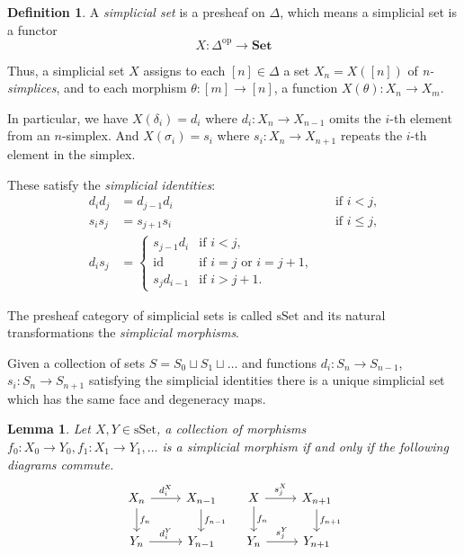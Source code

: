 \documentclass[12pt]{article}
\newtheorem{lemma}{Lemma}[section]
\theoremstyle{definition}
\newtheorem{definition}{Definition}[section]
\newcommand{\1}{\mathbbm{1}}
\newcommand{\Set}{\mathbf{Set}}
\begin{document}
\begin{definition}
    A \emph{simplicial set} is a presheaf on \( \Delta \), which means a simplicial set is a functor
    \[
    X \colon \Delta^{\mathrm{op}} \to \Set
    \]
    
    Thus, a simplicial set \( X \) assigns to each \( [n] \in \Delta \) a set \( X_n = X([n]) \) of \emph{n-simplices}, and to each morphism \( \theta \colon [m] \to [n] \), a function \( X(\theta) \colon X_n \to X_m \).
    
    In particular, we have $X(\delta_i) = d_i$ where $d_i: X_n\to X_{n-1}$ omits the $i$-th element from an $n$-simplex. And $X(\sigma_i) = s_i$ where $s_i: X_n \to X_{n+1}$ repeats the $i$-th element in the simplex.
    
    These satisfy the \emph{simplicial identities}:
    \[
    \begin{aligned}
    d_i d_j &= d_{j-1} d_i && \text{if } i < j, \\
    s_i s_j &= s_{j+1} s_i && \text{if } i \leq j, \\
    d_i s_j &=
    \begin{cases}
    s_{j-1} d_i & \text{if } i < j, \\
    \mathrm{id} & \text{if } i = j \text{ or } i = j+1, \\
    s_j d_{i-1} & \text{if } i > j+1.
    \end{cases}
    \end{aligned}
    \]

    The presheaf category of simplicial sets is called $\mathrm{sSet}$ and its natural transformations the \emph{simplicial morphisms}.
    
    Given a collection of sets $S = S_0 \sqcup S_1 \sqcup \dots$ and functions $d_i: S_n\to S_{n-1}$, $s_i: S_n \to S_{n+1}$ satisfying the simplicial identities there is a unique simplicial set which has the same face and degeneracy maps.
\end{definition}

\begin{lemma}
    Let $X, Y\in \mathrm{sSet}$, a collection of morphisms $f_0: X_0\to Y_0, f_1: X_1\to Y_1, \dots$ is a simplicial morphism if and only if the following diagrams commute.
    \[
        \begin{tikzcd}
        X_n \arrow{r}{d_i^X} \arrow{d}{f_n} & X_{n-1} \arrow{d}{f_{n-1}} \\
        Y_n \arrow{r}{d_i^Y} & Y_{n-1}
        \end{tikzcd}
        \quad
        \begin{tikzcd}
        X \arrow{r}{s_j^X} \arrow{d}{f_n} & X_{n+1} \arrow{d}{f_{n+1}} \\
        Y_n \arrow{r}{s_j^Y} & Y_{n+1}
        \end{tikzcd}
    \]
\end{lemma}
\end{document}

